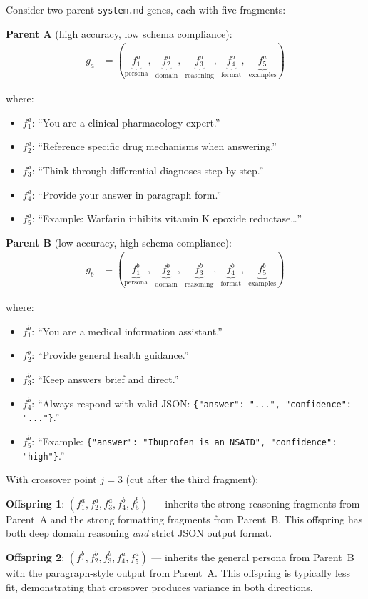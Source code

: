 \begin{example}
Consider two parent \texttt{system.md} genes, each with five fragments:

\medskip
\noindent\textbf{Parent A} (high accuracy, low schema compliance):
\begin{align*}
g_a &= (\underbrace{f_1^a}_{\text{persona}},\; \underbrace{f_2^a}_{\text{domain}},\; \underbrace{f_3^a}_{\text{reasoning}},\; \underbrace{f_4^a}_{\text{format}},\; \underbrace{f_5^a}_{\text{examples}})
\end{align*}

\noindent where:
\begin{itemize}[leftmargin=1.5em]
  \item $f_1^a$: ``You are a clinical pharmacology expert.''
  \item $f_2^a$: ``Reference specific drug mechanisms when answering.''
  \item $f_3^a$: ``Think through differential diagnoses step by step.''
  \item $f_4^a$: ``Provide your answer in paragraph form.''
  \item $f_5^a$: ``Example: Warfarin inhibits vitamin K epoxide reductase\ldots''
\end{itemize}

\noindent\textbf{Parent B} (low accuracy, high schema compliance):
\begin{align*}
g_b &= (\underbrace{f_1^b}_{\text{persona}},\; \underbrace{f_2^b}_{\text{domain}},\; \underbrace{f_3^b}_{\text{reasoning}},\; \underbrace{f_4^b}_{\text{format}},\; \underbrace{f_5^b}_{\text{examples}})
\end{align*}

\noindent where:
\begin{itemize}[leftmargin=1.5em]
  \item $f_1^b$: ``You are a medical information assistant.''
  \item $f_2^b$: ``Provide general health guidance.''
  \item $f_3^b$: ``Keep answers brief and direct.''
  \item $f_4^b$: ``Always respond with valid JSON: \texttt{\{"answer": "...", "confidence": "..."\}}.''
  \item $f_5^b$: ``Example: \texttt{\{"answer": "Ibuprofen is an NSAID", "confidence": "high"\}}.''
\end{itemize}

\noindent With crossover point $j = 3$ (cut after the third fragment):

\medskip
\noindent\textbf{Offspring 1}: $(f_1^a, f_2^a, f_3^a, f_4^b, f_5^b)$ --- inherits the strong reasoning fragments from Parent~A and the strong formatting fragments from Parent~B. This offspring has both deep domain reasoning \emph{and} strict JSON output format.

\noindent\textbf{Offspring 2}: $(f_1^b, f_2^b, f_3^b, f_4^a, f_5^a)$ --- inherits the general persona from Parent~B with the paragraph-style output from Parent~A. This offspring is typically less fit, demonstrating that crossover produces variance in both directions.
\end{example}

